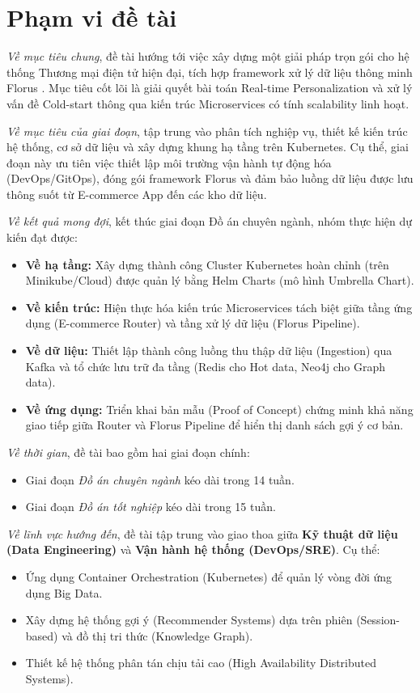 \section{Phạm vi đề tài}

\textit{Về mục tiêu chung}, đề tài hướng tới việc xây dựng một giải pháp trọn gói cho hệ thống Thương mại điện tử hiện đại, tích hợp framework xử lý dữ liệu thông minh Florus \cite{vo2024florus}. Mục tiêu cốt lõi là giải quyết bài toán Real-time Personalization và xử lý vấn đề Cold-start thông qua kiến trúc Microservices có tính scalability linh hoạt.

\textit{Về mục tiêu của giai đoạn}, tập trung vào phân tích nghiệp vụ, thiết kế kiến trúc hệ thống, cơ sở dữ liệu và xây dựng khung hạ tầng trên Kubernetes. Cụ thể, giai đoạn này ưu tiên việc thiết lập môi trường vận hành tự động hóa (DevOps/GitOps), đóng gói framework Florus và đảm bảo luồng dữ liệu được lưu thông suốt từ E-commerce App đến các kho dữ liệu.

\textit{Về kết quả mong đợi}, kết thúc giai đoạn Đồ án chuyên ngành, nhóm thực hiện dự kiến đạt được:
\begin{itemize}
    \item \textbf{Về hạ tầng:} Xây dựng thành công Cluster Kubernetes hoàn chỉnh (trên Minikube/Cloud) được quản lý bằng Helm Charts (mô hình Umbrella Chart).
    \item \textbf{Về kiến trúc:} Hiện thực hóa kiến trúc Microservices tách biệt giữa tầng ứng dụng (E-commerce Router) và tầng xử lý dữ liệu (Florus Pipeline).
    \item \textbf{Về dữ liệu:} Thiết lập thành công luồng thu thập dữ liệu (Ingestion) qua Kafka và tổ chức lưu trữ đa tầng (Redis cho Hot data, Neo4j cho Graph data).
    \item \textbf{Về ứng dụng:} Triển khai bản mẫu (Proof of Concept) chứng minh khả năng giao tiếp giữa Router và Florus Pipeline để hiển thị danh sách gợi ý cơ bản.
\end{itemize}

\textit{Về thời gian}, đề tài bao gồm hai giai đoạn chính:
\begin{itemize}
    \item Giai đoạn \textit{Đồ án chuyên ngành} kéo dài trong 14 tuần.
    \item Giai đoạn \textit{Đồ án tốt nghiệp} kéo dài trong 15 tuần.
\end{itemize}

\textit{Về lĩnh vực hướng đến}, đề tài tập trung vào giao thoa giữa \textbf{Kỹ thuật dữ liệu (Data Engineering)} và \textbf{Vận hành hệ thống (DevOps/SRE)}. Cụ thể:
\begin{itemize}
    \item Ứng dụng Container Orchestration (Kubernetes) để quản lý vòng đời ứng dụng Big Data.
    \item Xây dựng hệ thống gợi ý (Recommender Systems) dựa trên phiên (Session-based) và đồ thị tri thức (Knowledge Graph).
    \item Thiết kế hệ thống phân tán chịu tải cao (High Availability Distributed Systems).
\end{itemize}
